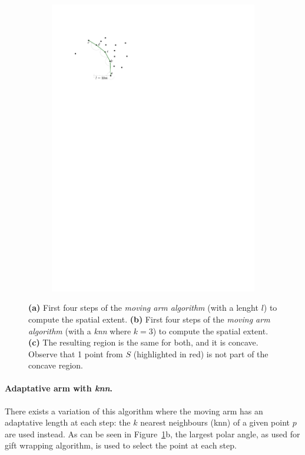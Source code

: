 \begin{figure}
\begin{subfigure}[b]{0.3\linewidth}
    \includegraphics[page=3,width=\textwidth]{figs/movingarm.pdf}
    \caption{}
  \end{subfigure}
  \caption{\textbf{(a)} First four steps of the \emph{moving arm algorithm} (with a lenght $l$) to compute the spatial extent. \textbf{(b)} First four steps of the \emph{moving arm algorithm} (with a \emph{knn} where $k=3$) to compute the spatial extent. \textbf{(c)} The resulting region is the same for both, and it is concave. Observe that 1 point from $S$ (highlighted in red) is not part of the concave region.}
\label{fig:movingarm}
\end{figure}

%

\paragraph{Adaptative arm with \emph{knn}.} 
There exists a variation of this algorithm where the moving arm has an adaptative length at each step: the $k$ nearest neighbours (knn) of a given point $p$ are used instead.
As can be seen in Figure~\ref{fig:movingarm}b, the largest polar angle, as used for gift wrapping algorithm, is used to select the point at each step.

